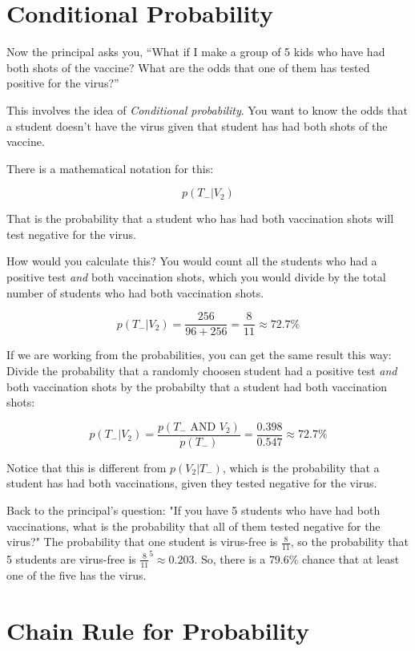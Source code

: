 \section{Conditional Probability}

Now the principal asks you, ``What if I make a group of 5 kids who
have had both shots of the vaccine? What are the odds that one of them
has tested positive for the virus?''

This involves the idea of \textit{Conditional probability}.  You want
to know the odds that a student doesn't have the virus given that
student has had both shots of the vaccine.

There is a mathematical notation for this:

$$p(T_{-} | V_{2})$$

That is the probability that a student who has had both vaccination
shots will test negative for the virus.

How would you calculate this? You would count all the students who had
a positive test \textit{and} both vaccination shots, which you would
divide by the total number of students who had both vaccination shots.

$$p(T_{-} | V_{2}) = \frac{256}{96 + 256} = \frac{8}{11} \approx 72.7\%$$

If we are working from the probabilities, you can get the same result
this way: Divide the probability that a randomly choosen student had a
positive test \textit{and} both vaccination shots by the probabilty
that a student had both vaccination shots:

$$p(T_{-} | V_{2}) = \frac{p(T_{-} \text{ AND } V_{2})}{p(T_{-})} =  \frac{0.398}{0.547} \approx 72.7\%$$

Notice that this is different from $p( V_{2} | T_{-})$, which is the
probability that a student has had both vaccinations, given they
tested negative for the virus.

Back to the principal's question: "If you have 5 students who have had
both vaccinations, what is the probability that all of them tested
negative for the virus?" The probability that one student is virus-free
is $\frac{8}{11}$, so the probability that 5 students are virus-free
is $\frac{8}{11}^5 \approx 0.203$.  So, there is a $79.6\%$ chance
that at least one of the five has the virus.

\section{Chain Rule for Probability}

